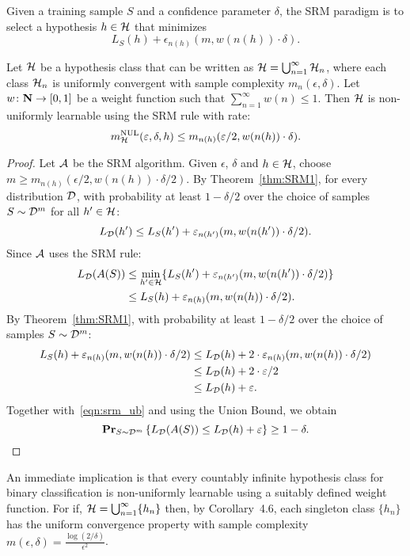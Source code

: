 Given a training sample $S$ and a confidence parameter $\delta$,
the SRM paradigm is to select a hypothesis $h \in \mathcal{H}$ that minimizes
\[
    L_S(h) + \epsilon_{n(h)} (m, w( n(h) ) \cdot \delta).
\]
\begin{theorem}
\label{thm:SRM2}
Let $\mathcal{H}$ be a hypothesis class that can be written as $\mathcal{H} =
\bigcup_{n = 1}^{\infty} \mathcal{H}_n$, where each class $\mathcal{H}_n$ is
uniformly convergent with sample complexity $m_n(\epsilon, \delta)$. Let $w
\colon \mathbf{N} \rightarrow [0, 1]$ be a weight function such that  $\sum_{n =
1}^{\infty} w(n) \leq 1$. Then $\mathcal{H}$ is non-uniformly learnable
using the SRM rule with rate:
\[
    m_{\mathcal{H}}^{\text{NUL}} (\varepsilon, \delta, h) \leq m_{n(h)} (\varepsilon / 2, w( n(h) ) \cdot \delta).
\]
\end{theorem}
\begin{proof}
Let $\mathcal{A}$ be the SRM algorithm. Given $\epsilon$, $\delta$ and $h \in \mathcal{H}$,
choose $m \geq m_{n(h)} (\epsilon / 2, w( n (h) ) \cdot \delta / 2)$.
By Theorem~\ref{thm:SRM1}, for every distribution $\mathcal{D}$, with probability at least
$1 - \delta / 2$ over the choice of samples $S \sim \mathcal{D}^m$ for all $h' \in \mathcal{H}$:
\[
    L_{\mathcal{D}} (h') \leq L_S(h') + \varepsilon_{n(h')} (m, w( n(h') ) \cdot \delta / 2).
\]
Since $\mathcal{A}$ uses the SRM rule:
\begin{align}\label{eqn:srm_ub}
    L_{\mathcal{D}} (A(S))
        &  \leq \min_{h' \in \mathcal{H}} \{
            L_S(h') + \varepsilon_{n(h')} (m, w( n(h') ) \cdot \delta / 2) \} \nonumber \\
        & \leq L_S(h) +  \varepsilon_{n(h)} (m, w( n(h) ) \cdot \delta / 2).
\end{align}
By Theorem~\ref{thm:SRM1}, with probability at least  $1 - \delta / 2$ over the
choice of samples $S \sim \mathcal{D}^m$:
\begin{align}
    L_S(h) +  \varepsilon_{n(h)} (m, w( n(h) ) \cdot \delta / 2)
        & \leq L_{\mathcal{D}}(h) +  2 \cdot \varepsilon_{n(h)} (m, w( n(h) ) \cdot \delta / 2) \nonumber \\
        & \leq L_{\mathcal{D}}(h) + 2 \cdot \varepsilon / 2 \nonumber \\
        & \leq L_{\mathcal{D}}(h) + \varepsilon.
\end{align}
Together with~\ref{eqn:srm_ub} and using the Union Bound, we obtain
\[
    \mathbf{Pr}_{S \sim \mathcal{D}^m} \left \{ L_{\mathcal{D}} (A(S)) \leq L_{\mathcal{D}}(h) + \varepsilon \right \} \geq 1 - \delta.
\]
\end{proof}

An immediate implication is that every countably infinite hypothesis class for
binary classification is non-uniformly learnable using a suitably defined weight
function. For if, $\mathcal{H} = \bigcup_{n = 1}^{\infty} \{ h_n \}$ then, by
Corollary~4.6, each singleton class $\{ h_n \}$ has the uniform convergence property with
sample complexity $m (\epsilon, \delta) = \frac{\log (2 / \delta)}{\epsilon^2}$.


